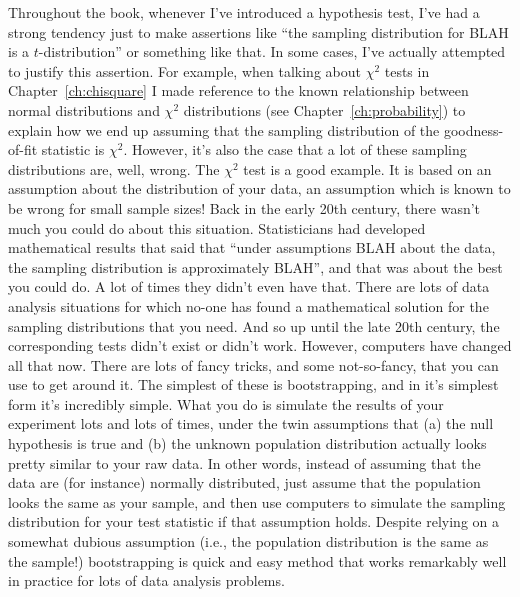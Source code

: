 \begin{itemize}

 Throughout the book, whenever I've introduced a hypothesis test, I've had a strong tendency just to make assertions like ``the sampling distribution for BLAH is a $t$-distribution'' or something like that. In some cases, I've actually attempted to justify this assertion. For example, when talking about $\chi^2$ tests in Chapter~\ref{ch:chisquare} I made reference to the known relationship between normal distributions and $\chi^2$ distributions (see Chapter~\ref{ch:probability}) to explain how we end up assuming that the sampling distribution of the goodness-of-fit statistic is $\chi^2$. However, it's also the case that a lot of these sampling distributions are, well, wrong. The $\chi^2$ test is a good example. It is based on an assumption about the distribution of your data, an assumption which is known to be wrong for small sample sizes! Back in the early 20th century, there wasn't much you could do about this situation. Statisticians had developed mathematical results that said that ``under assumptions BLAH about the data, the sampling distribution is approximately BLAH'', and that was about the best you could do. A lot of times they didn't even have that. There are lots of data analysis situations for which no-one has found a mathematical solution for the sampling distributions that you need. And so up until the late 20th century, the corresponding tests didn't exist or didn't work. However, computers have changed all that now. There are lots of fancy tricks, and some not-so-fancy, that you can use to get around it. The simplest of these is bootstrapping, and in it's simplest form it's incredibly simple. What you do is simulate the results of your experiment lots and lots of times, under the twin assumptions that (a) the null hypothesis is true and (b) the unknown population distribution actually looks pretty similar to your raw data. In other words, instead of assuming that the data are (for instance) normally distributed, just assume that the population looks the same as your sample, and then use computers to simulate the sampling distribution for your test statistic if that assumption holds. Despite relying on a somewhat dubious assumption (i.e., the population distribution is the same as the sample!) bootstrapping is quick and easy method that works remarkably well in practice for lots of data analysis problems. 


\end{itemize}
